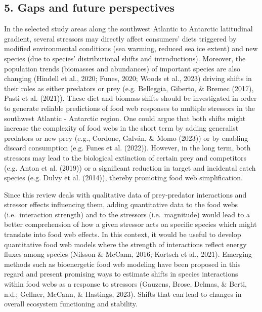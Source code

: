 \documentclass[
]{article}
\begin{document}
\normalsize

\subsection{5. Gaps and future
perspectives}\label{gaps-and-future-perspectives}

In the selected study areas along the southwest Atlantic to Antarctic
latitudinal gradient, several stressors may directly affect consumers'
diets triggered by modified environmental conditions (sea warming,
reduced sea ice extent) and new species (due to species' distributional
shifts and introductions). Moreover, the population trends (biomasses
and abundances) of important species are also changing (Hindell et al.,
2020; Funes, 2020; Woods et al., 2023) driving shifts in their roles as
either predators or prey (e.g. Belleggia, Giberto, \& Bremec (2017),
Pasti et al. (2021)). These diet and biomass shifts should be
investigated in order to generate reliable predictions of food web
responses to multiple stressors in the southwest Atlantic - Antarctic
region. One could argue that both shifts might increase the complexity
of food webs in the short term by adding generalist predators or new
prey (e.g., Cordone, Galván, \& Momo (2023)) or by enabling discard
consumption (e.g. Funes et al. (2022)). However, in the long term, both
stressors may lead to the biological extinction of certain prey and
competitors (e.g. Anton et al. (2019)) or a significant reduction in
target and incidental catch species (e.g. Dulvy et al. (2014)), thereby
promoting food web simplification.

Since this review deals with qualitative data of prey-predator
interactions and stressor effects influencing them, adding quantitative
data to the food webs (i.e.~interaction strength) and to the stressors
(i.e.~magnitude) would lead to a better comprehension of how a given
stressor acts on specific species which might translate into food web
effects. In this context, it would be useful to develop quantitative
food web models where the strength of interactions reflect energy fluxes
among species (Nilsson \& McCann, 2016; Kortsch et al., 2021). Emerging
methods such as bioenergetic food web modeling have been proposed in
this regard and present promising ways to estimate shifts in species
interactions within food webs as a response to stressors (Gauzens,
Brose, Delmas, \& Berti, n.d.; Gellner, McCann, \& Hastings, 2023).
Shifts that can lead to changes in overall ecosystem functioning and
stability.
\end{document}
